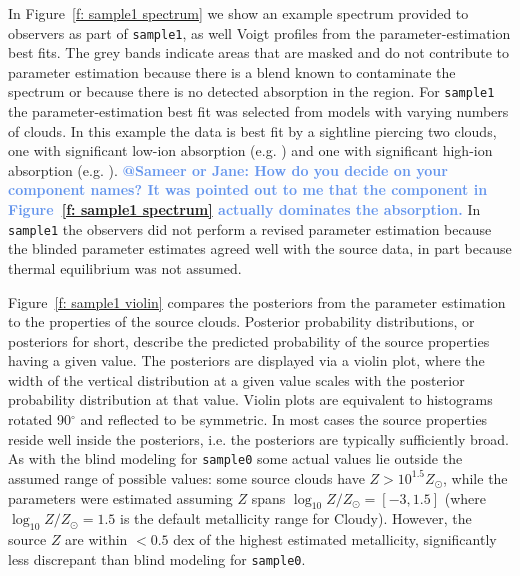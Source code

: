 \documentclass[fleqn,usenatbib]{mnras}
\makeatletter
\newcommand{\atsameer}[1]{\textcolor{CornflowerBlue}{\textbf{@Sameer or Jane: #1}}}
\makeatother
\begin{document}
In Figure~\ref{f: sample1 spectrum} we show an example spectrum provided to observers as part of \texttt{sample1},
as well Voigt profiles from the parameter-estimation best fits.
The grey bands indicate areas that are masked and do not contribute to parameter estimation because there is a blend known to contaminate the spectrum or because there is no detected absorption in the region.
For \texttt{sample1} the parameter-estimation best fit was selected from models with varying numbers of clouds.
In this example the data is best fit by a sightline piercing two clouds, one with significant low-ion absorption (e.g. )  and one with significant high-ion absorption (e.g. ).
\atsameer{How do you decide on your component names? It was pointed out to me that the \ion{O}{VI} component in Figure~\ref{f: sample1 spectrum} actually dominates the \ion{C}{II} absorption.}
In \texttt{sample1} the observers did not perform a revised parameter estimation because the blinded parameter estimates agreed well with the source data, in part because thermal equilibrium was not assumed.

Figure~\ref{f: sample1 violin} compares the posteriors from the parameter estimation to the properties of the source clouds.
Posterior probability distributions, or posteriors for short, describe the predicted probability of the source properties having a given value.
The posteriors are displayed via a violin plot,
where the width of the vertical distribution at a given value scales with the posterior probability distribution at that value.
Violin plots are equivalent to histograms rotated 90$^\circ$ and reflected to be symmetric.
In most cases the source properties reside well inside the posteriors, i.e. the posteriors are typically sufficiently broad.
As with the blind modeling for \texttt{sample0} some actual values lie outside the assumed range of possible values: 
some source clouds have $Z > 10^{1.5} Z_\odot$, while the parameters were estimated assuming $Z$ spans $\log_{10} Z/Z_\odot = [-3, 1.5]$ (where $\log_{10} Z/Z_\odot = 1.5$ is the default metallicity range for Cloudy).
However, the source $Z$ are within $< 0.5$ dex of the highest estimated metallicity, significantly less discrepant than blind modeling for \texttt{sample0}.
\end{document}
